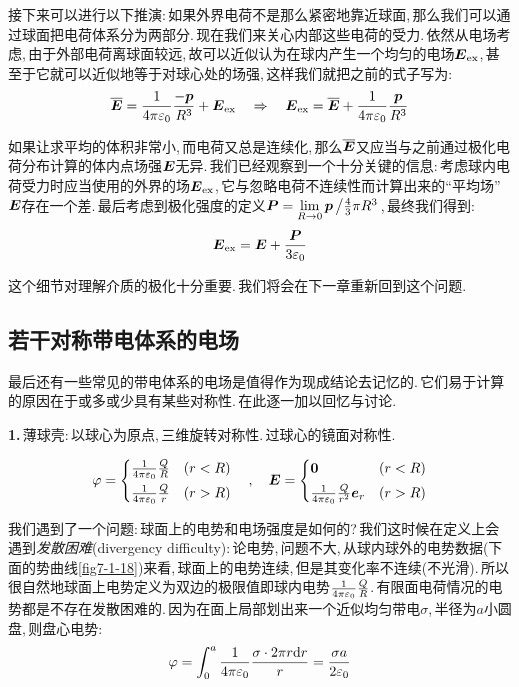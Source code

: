 接下来可以进行以下推演:\,如果外界电荷不是那么紧密地靠近球面,\,那么我们可以通过球面把电荷体系分为两部分.\,现在我们来关心内部这些电荷的受力.\,依然从电场考虑,\,由于外部电荷离球面较远,\,故可以近似认为在球内产生一个均匀的电场$\boldsymbol{E}_{\rm ex}$,\,甚至于它就可以近似地等于对球心处的场强,\,这样我们就把之前的式子写为:
\[\overline{\boldsymbol{E}}=\frac{1}{4\pi\varepsilon_0} \frac{-\boldsymbol{p}}{R^3}+\boldsymbol{E}_{\rm ex} \quad\Rightarrow \quad \boldsymbol{E}_{\rm ex}=\overline{\boldsymbol{E}}+\frac{1}{4\pi\varepsilon_0} \frac{\boldsymbol{p}}{R^3}\]

如果让求平均的体积非常小,\,而电荷又总是连续化,\,那么$\overline{\boldsymbol{E}}$又应当与之前通过极化电荷分布计算的体内点场强$\boldsymbol{E}$无异.\,我们已经观察到一个十分关键的信息:\,考虑球内电荷受力时应当使用的外界的场$\boldsymbol{E}_{\rm ex}$,\,它与忽略电荷不连续性而计算出来的``平均场''$\boldsymbol{E}$存在一个差.\,最后考虑到极化强度的定义$\boldsymbol{P}=\lim\limits_{R\to 0}\boldsymbol{p}\left/\frac{4}{3}\pi R^3\right.$,\,最终我们得到:
\[\boldsymbol{E}_{\rm ex}=\boldsymbol{E}+\frac{\boldsymbol{P}}{3\varepsilon_0}\]

这个细节对理解介质的极化十分重要.\,我们将会在下一章重新回到这个问题.

\subsection{若干对称带电体系的电场}

最后还有一些常见的带电体系的电场是值得作为现成结论去记忆的.\,它们易于计算的原因在于或多或少具有某些对称性.\,在此逐一加以回忆与讨论.

\vspace{0.3cm}
\textbf{1.}\,薄球壳:\,以球心为原点,\,三维旋转对称性.\,过球心的镜面对称性.

\[\varphi=\begin{cases} \frac{1}{4\pi\varepsilon_0} \frac{Q}{R}& (r<R) \\[3pt] \frac{1}{4\pi\varepsilon_0} \frac{Q}{r} & (r>R) \end{cases} \quad,	\quad \boldsymbol{E}=\begin{cases}  \boldsymbol{0} & (r<R) \\[3pt] \frac{1}{4\pi\varepsilon_0} \frac{Q}{r^2}\boldsymbol{e}_r & (r>R) \end{cases}\]

我们遇到了一个问题:\,球面上的电势和电场强度是如何的?\,我们这时候在定义上会遇到\emph{发散困难}(divergency difficulty):\,论电势,\,问题不大,\,从球内球外的电势数据(下面的势曲线\ref{fig7-1-18})来看,\,球面上的电势连续,\,但是其变化率不连续(不光滑).\,所以很自然地球面上电势定义为双边的极限值即球内电势$\frac{1}{4\pi\varepsilon_0} \frac{Q}{R}$.\,有限面电荷情况的电势都是不存在发散困难的.\,因为在面上局部划出来一个近似均匀带电$\sigma$,\,半径为$a$小圆盘,\,则盘心电势:
\[\varphi=\int_0^a \frac{1}{4\pi\varepsilon_0} \frac{\sigma \cdot 2\pi r \textrm{d} r}{r}=\frac{\sigma a}{2\varepsilon_0}\]


